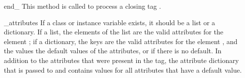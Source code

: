 \begin{funcdesc}{end_}{}
This method is called to process a closing tag .
\end{funcdesc}

\begin{datadesc}{_attributes}
If a class or instance variable  exists, it 
should be a list or a dictionary.  If a list, the elements of the list 
are the valid attributes for the element ; if a dictionary,
the keys are the valid attributes for the element , and the
values the default values of the attributes, or  if there
is no default.
In addition to the attributes that were present in the tag, the
attribute dictionary that is passed to  and
 contains values for all attributes that have a
default value.
\end{datadesc}
